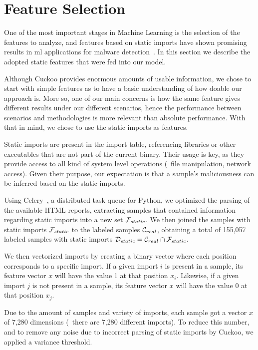 \section{Feature Selection}
\label{section:feature_selection}

One of the most important stages in Machine Learning is the selection of the features to analyze, and features based on static imports have shown promising results in \gls{ml} applications for malware detection~\cite{miller:rev_int,schultz:data_mining}.
In this section we describe the adopted static features that were fed into our model.

Although Cuckoo provides enormous amounts of usable information, we chose to start with simple features as to have a basic understanding of how doable our approach is.
More so, one of our main concerns is how the same feature gives different results under our different scenarios, hence the performance between scenarios and methodologies is more relevant than absolute performance.
With that in mind, we chose to use the static imports as features.

Static imports are present in the import table, referencing libraries or other executables that are not part of the current binary.
Their usage is key, as they provide access to all kind of system level operations (\eg\ file manipulation, network access). Given their purpose, our expectation is that a sample's maliciousness can be inferred based on the static imports.

Using Celery~\cite{tool:celery}, a distributed task queue for Python, we optimized the parsing of the available HTML reports, extracting samples that contained information regarding static imports into a new set $\mathcal{F}_{static}$.
We then joined the samples with static imports $\mathcal{F}_{static}$ to the labeled samples $\mathcal{C}_{real}$, obtaining a total of 155,057 labeled samples with static imports $\mathcal{D}_{static} = \mathcal{C}_{real} \cap \mathcal{F}_{static}$.

We then vectorized imports by creating a binary vector where each position corresponds to a specific import.
If a given import $i$ is present in a sample, its feature vector $x$ will have the value 1 at that position $x_i$.
Likewise, if a given import $j$ is not present in a sample, its feature vector $x$ will have the value 0 at that position $x_j$.

Due to the amount of samples and variety of imports, each sample got a vector $x$ of 7,280 dimensions (\ie\ there are 7,280 different imports).
To reduce this number, and to remove any noise due to incorrect parsing of static imports by Cuckoo, we applied a variance threshold.

